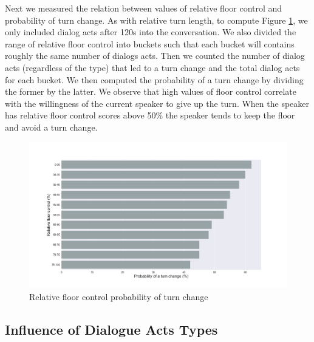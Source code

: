 Next we measured the relation between values of relative floor control and probability of turn change.
As with relative turn length, to compute Figure \ref{fig:rfc:turn}, we only included dialog acts after 120s into the conversation. We also divided the range of relative floor control into buckets such that each bucket will contains roughly the same number of dialogs acts. Then we counted the number of dialog acts (regardless of the type) that led to a turn change and the total dialog acts for each bucket. We then computed the probability of a turn change by dividing the former by the latter.
We observe that high values of floor control correlate with the willingness of the current speaker to give up the turn. When the speaker has relative floor control scores above 50\% the speaker tends to keep the floor and avoid a turn change.
%
\begin{figure}[ht!]
\centering
\includegraphics[width=\textwidth]{../scikitlearn/figures/f6.png}\vspace{-0.5em}
\caption{Relative floor control probability of turn change}
\label{fig:rfc:turn}
\end{figure}



\subsection{Influence of Dialogue Acts Types}

